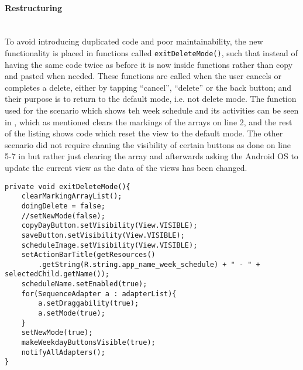 \paragraph{Restructuring} \hfill\\
To avoid introducing duplicated code and poor maintainability, the new functionality is placed in functions called \texttt{exitDeleteMode()}, such that instead of having the same code twice as before it is now inside functions rather than copy and pasted when needed.
These functions are called when the user cancels or completes a delete, either by tapping \enquote{cancel}, \enquote{delete} or the back button;
and their purpose is to return to the default mode, i.e. not delete mode.
The function used for the scenario which shows teh week schedule and its activities can be seen in , which as mentioned clears the markings of the arrays on line 2, and the rest of the listing shows code which reset the view to the default mode.
The other scenario did not require chaning the visibility of certain buttons as done on line 5-7 in  but rather just clearing the array and afterwards asking the Android OS to update the current view as the data of the views has been changed.

\begin{lstlisting}[caption={The \texttt{exitDeleteMode()} function, which returns the application to the default mode}, label={lst:exitdeletemode}]
private void exitDeleteMode(){
    clearMarkingArrayList();
    doingDelete = false;
    //setNewMode(false);
    copyDayButton.setVisibility(View.VISIBLE);
    saveButton.setVisibility(View.VISIBLE);
    scheduleImage.setVisibility(View.VISIBLE);
    setActionBarTitle(getResources()
        .getString(R.string.app_name_week_schedule) + " - " + selectedChild.getName());
    scheduleName.setEnabled(true);
    for(SequenceAdapter a : adapterList){
        a.setDraggability(true);
        a.setMode(true);
    }
    setNewMode(true);
    makeWeekdayButtonsVisible(true);
    notifyAllAdapters();
}
\end{lstlisting}
